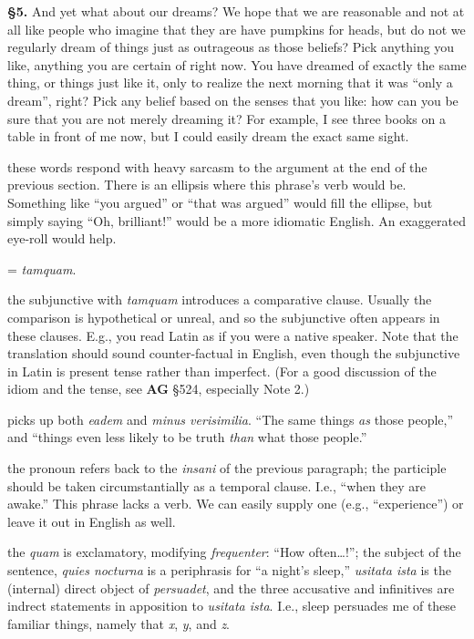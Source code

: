 \prenotes

\textbf{§5.} And yet what about our dreams? We hope that we are reasonable and not at all like people who imagine that they are have pumpkins for heads, but do not we regularly dream of things just as outrageous as those beliefs? Pick anything you like, anything you are certain of right now. You have dreamed of exactly the same thing, or things just like it, only to realize the next morning that it was ``only a dream'', right? Pick any belief based on the senses that you like: how can you be sure that you are not merely dreaming it? For example, I see three books on a table in front of me now, but I could easily dream the exact same sight.

 these words respond with heavy sarcasm to the argument at the end of the previous section. There is an ellipsis where this phrase's verb would be. Something like ``you argued'' or ``that was argued'' would fill the ellipse, but simply saying ``Oh, brilliant!'' would be a more idiomatic English. An exaggerated eye-roll would help.

 = \textit{tamquam}.

 the subjunctive with \textit{tamquam} introduces a comparative clause. Usually the comparison is hypothetical or unreal, and so the subjunctive often appears in these clauses. E.g., you read Latin as if you were a native speaker. Note that the translation should sound counter-factual in English, even though the subjunctive in Latin is present tense rather than imperfect. (For a good discussion of the idiom and the tense, see \textbf{AG} §524, especially Note 2.)

 picks up both \textit{eadem} and \textit{minus verisimilia}. ``The same things \textit{as} those people,'' and ``things even less likely to be truth \textit{than} what those people.''

 the pronoun refers back to the \textit{insani} of the previous paragraph; the participle should be taken circumstantially as a temporal clause. I.e., ``when they are awake.'' This phrase lacks a verb. We can easily supply one (e.g., ``experience'') or leave it out in English as well.

 the \textit{quam} is exclamatory, modifying \textit{frequenter}: ``How often\dots !''; the subject of the sentence, \textit{quies nocturna} is a periphrasis for ``a night's sleep,'' \textit{usitata ista} is the (internal) direct object of \textit{persuadet}, and the three accusative and infinitives are indrect statements in apposition to \textit{usitata ista}. I.e., sleep persuades me of these familiar things, namely that \textit{x}, \textit{y}, and \textit{z}.


